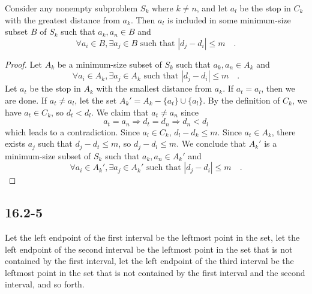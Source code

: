 \begin{claim}
    Consider any nonempty subproblem $S_k$ where $k \neq n$, 
    and let $a_l$ be the stop in $C_k$ with the greatest distance from $a_k$.
    Then $a_l$ is included in some minimum-size subset $B$ of $S_k$ such that
    $a_k, a_n \in B$ and
    \begin{equation*}
        \forall a_i \in B, \exists a_j \in B \text{ such that }
        | d_j - d_i | \leq m
        \quad .
    \end{equation*}
\end{claim}

\begin{proof}
    Let $A_k$ be a minimum-size subset of $S_k$ such that
    $a_k, a_n \in A_k$ and
    \begin{equation*}
        \forall a_i \in A_k, \exists a_j \in A_k \text{ such that }
        | d_j - d_i | \leq m
        \quad .
    \end{equation*}
    Let $a_t$ be the stop in $A_k$ with the smallest distance from $a_k$.
    If $a_t = a_l$, then we are done.
    If $a_t \neq a_l$, let the set $A_k' = A_k - \{ a_t \} \cup \{ a_l \}$.
    By the definition of $C_k$, we have $a_t \in C_k$, so $d_t < d_l$.
    We claim that $a_t \neq a_n$ since
    \begin{equation*}
        a_t = a_n \Longrightarrow d_t = d_n \Longrightarrow d_n < d_l
    \end{equation*}
    which leads to a contradiction.
    Since $a_l \in C_k$, $d_l - d_k \leq m$.
    Since $a_t \in A_k$, there exists $a_j$ such that $d_j - d_t \leq m$,
    so $d_j - d_l \leq m$.
    We conclude that $A_k'$ is a minimum-size subset of $S_k$ such that
    $a_k, a_n \in A_k'$ and
    \begin{equation*}
        \forall a_i \in A_k', \exists a_j \in A_k' \text{ such that }
        | d_j - d_i | \leq m
        \quad .
    \end{equation*}
\end{proof}

\subsection*{16.2-5}

Let the left endpoint of the first interval be the leftmost point in the set,
let the left endpoint of the second interval be the leftmost point in the set 
that is not contained by the first interval,
let the left endpoint of the third interval be the leftmost point in the set 
that is not contained by the first interval and the second interval,
and so forth.

